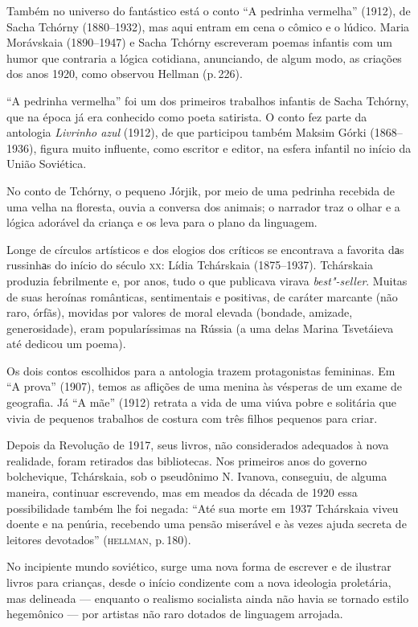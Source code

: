 Também no universo do fantástico está o conto ``A pedrinha vermelha''
(1912), de Sacha Tchórny (1880--1932), mas aqui entram em cena o
cômico e o lúdico. Maria Morávskaia (1890--1947) e Sacha Tchórny
escreveram poemas infantis com um humor que contraria a lógica
cotidiana, anunciando, de algum modo, as criações dos anos 1920, como
observou Hellman (p.\,226).

``A pedrinha vermelha'' foi um dos primeiros trabalhos infantis de Sacha
Tchórny, que na época já era conhecido como poeta satirista. O conto fez
parte da antologia \emph{Livrinho azul} (1912), de que participou também
Maksim Górki (1868--1936), figura muito influente, como escritor e
editor, na esfera infantil no início da União Soviética.

No conto de Tchórny, o pequeno Jórjik, por meio de uma pedrinha recebida
de uma velha na floresta, ouvia a conversa dos animais; o narrador traz
o olhar e a lógica adorável da criança e os leva para o plano da
linguagem.

Longe de círculos artísticos e dos elogios dos críticos se encontrava a
favorita dаs russinhаs do início do século \textsc{xx}: Lídia Tchárskaia
(1875--1937). Tchárskaia produzia febrilmente e, por anos, tudo o que
publicava virava \emph{best"-seller}. Muitas de suas heroínas românticas,
sentimentais e positivas, de caráter marcante (não raro, órfãs), movidas
por valores de moral elevada (bondade, amizade, generosidade), eram
popularíssimas na Rússia (a uma delas Marina Tsvetáieva até dedicou um
poema).

Os dois contos escolhidos para a antologia trazem protagonistas
femininas. Em ``A prova'' (1907), temos as aflições de uma menina
às vésperas de um exame de geografia. Já ``A mãe'' (1912) retrata
a vida de uma viúva pobre e solitária que vivia de pequenos trabalhos de
costura com três filhos pequenos para criar.

Depois da Revolução de 1917, seus livros, não considerados adequados à
nova realidade, foram retirados das bibliotecas. Nos primeiros anos do
governo bolchevique, Tchárskaia, sob o pseudônimo N. Ivanova,
conseguiu, de alguma maneira, continuar escrevendo, mas em meados da
década de 1920 essa possibilidade também lhe foi negada: ``Até sua morte
em 1937 Tchárskaia viveu doente e na penúria, recebendo uma pensão
miserável e às vezes ajuda secreta de leitores devotados'' (\textsc{hellman}, p.\,180).

No incipiente mundo soviético, surge uma nova forma de escrever e de
ilustrar livros para crianças, desde o início condizente com a nova
ideologia proletária, mas delineada --- enquanto o realismo socialista
ainda não havia se tornado estilo hegemônico --- por artistas não raro
dotados de linguagem arrojada.


